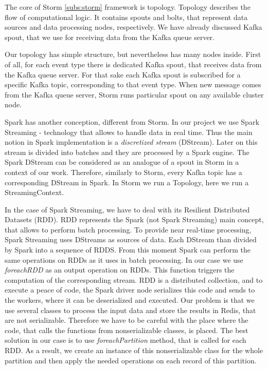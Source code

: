 The core of Storm \ref{subs:storm} framework is topology.
Topology describes the flow of computational logic.
It contains spouts and bolts, that represent data sources and data processing nodes, respectively.
We have already discussed Kafka spout, that we use for receiving data from the Kafka queue server.

Our topology has simple structure, but nevertheless has many nodes inside.
First of all, for each event type there is dedicated Kafka spout, that receives data from the Kafka queue server.
For that sake each Kafka spout is subscribed for a specific Kafka topic, corresponding to that event type.
When new message comes from the Kafka queue server, Storm runs particular spout on any available cluster node.

Spark has another conception, different from Storm.
In our project we use Spark Streaming - technology that allows to handle data in real time.
Thus the main notion in Spark implementation is a \textit{discretized stream} (DStream).
Later on this stream is divided into batches and they are processed by a Spark engine.
The Spark DStream can be considered as an analogue of a spout in Storm in a context of our work.
Therefore, similarly to Storm, every Kafka topic has a corresponding DStream in Spark.
In Storm we run a Topology, here we run a StreamingContext.

In the case of Spark Streaming, we have to deal with its Resilient Distributed Datasets (RDD).
RDD represents the Spark (not Spark Streaming) main concept, that allows to perform batch processing.
To provide near real-time processing, Spark Streaming uses DStreams as sources of data.
Each DStream than divided by Spark into a sequence of RDDS.
From this moment Spark can perform the same operations on RDDs as it uses in batch processing.
In our case we use \textit{foreachRDD} as an output operation on RDDs.
This function triggers the computation of the corresponding stream.
RDD is a distributed collection, and to execute a peace of code, the Spark driver node serializes this code and sends to the workers, where it can be deserialized and executed.
Our problem is that we use several classes to process the input data and store the results in Redis, that are not serializable.
Therefore we have to be careful with the place where the code, that calls the functions from nonserializable classes, is placed.
The best solution in our case is to use \textit{foreachPartition} method, that is called for each RDD.
As a result, we create an instance of this nonserializable class for the whole partition and then apply the needed operations on each record of this partition. 

